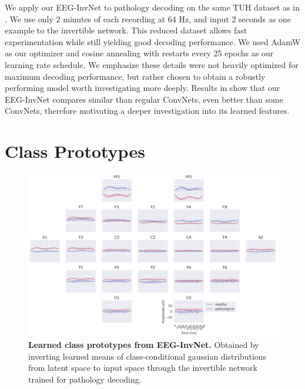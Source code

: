     We apply our EEG-InvNet to pathology decoding on the same TUH dataset as
in . We use only 2 minutes of each recording at
64 Hz, and input 2 seconds as one example to the invertible network.
This reduced dataset allows fast experimentation while still yielding
good decoding performance. We used AdamW
\citep{DBLP:conf/iclr/LoshchilovH19} as our optimizer and
cosine annealing with restarts
\citep{DBLP:conf/iclr/LoshchilovH17} every 25 epochs as our
learning rate schedule. We emphasize these details were not heavily
optimized for maximum decoding performance, but rather chosen to obtain
a robustly performing model worth investigating more deeply. Results in
 show that our
EEG-InvNet compares similar than regular ConvNets, even better than some
ConvNets, therefore motivating a deeper investigation into its learned
features.

\section{Class Prototypes}\label{class-prototypes}

\begin{figure}[htb]
    \myfloatalign
    \includegraphics[width=1\linewidth]{images/net-disc-prototypes.png}
    \caption[Learned class prototypes from EEG-InvNet]{
\textbf{Learned class prototypes from EEG-InvNet.} Obtained by inverting
learned means of class-conditional gaussian distributions from latent
space to input space through the invertible network trained for
pathology decoding.
}
\label{disc-invnet-prototypes}
\end{figure}



